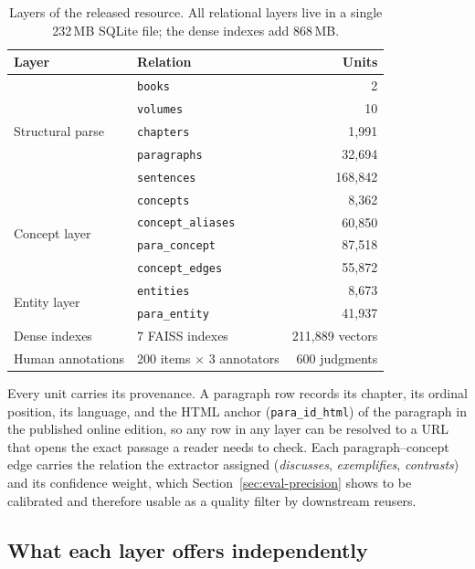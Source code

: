 \documentclass[pdflatex,sn-mathphys-num]{sn-jnl}
\begin{document}
\begin{table}[t]
\centering
\caption{Layers of the released resource. All relational layers live in a
single 232\,MB SQLite file; the dense indexes add 868\,MB.}
\label{tab:resource}
\begin{tabular}{llr}
\toprule
Layer & Relation & Units\\
\midrule
\multirow{5}{*}{Structural parse}
  & \texttt{books}            & 2\\
  & \texttt{volumes}          & 10\\
  & \texttt{chapters}         & 1{,}991\\
  & \texttt{paragraphs}       & 32{,}694\\
  & \texttt{sentences}        & 168{,}842\\
\midrule
\multirow{4}{*}{Concept layer}
  & \texttt{concepts}         & 8{,}362\\
  & \texttt{concept\_aliases} & 60{,}850\\
  & \texttt{para\_concept}    & 87{,}518\\
  & \texttt{concept\_edges}   & 55{,}872\\
\midrule
\multirow{2}{*}{Entity layer}
  & \texttt{entities}         & 8{,}673\\
  & \texttt{para\_entity}     & 41{,}937\\
\midrule
Dense indexes
  & 7 FAISS indexes           & 211{,}889 vectors\\
\midrule
Human annotations
  & 200 items $\times$ 3 annotators & 600 judgments\\
\bottomrule
\end{tabular}
\end{table}

Every unit carries its provenance. A paragraph row records its chapter,
its ordinal position, its language, and the HTML anchor
(\texttt{para\_id\_html}) of the paragraph in the published online
edition, so any row in any layer can be resolved to a URL that opens the
exact passage a reader needs to check. Each paragraph--concept edge
carries the relation the extractor assigned (\emph{discusses},
\emph{exemplifies}, \emph{contrasts}) and its confidence weight, which
Section~\ref{sec:eval-precision} shows to be calibrated and therefore
usable as a quality filter by downstream reusers.

\subsection{What each layer offers independently}
\end{document}

